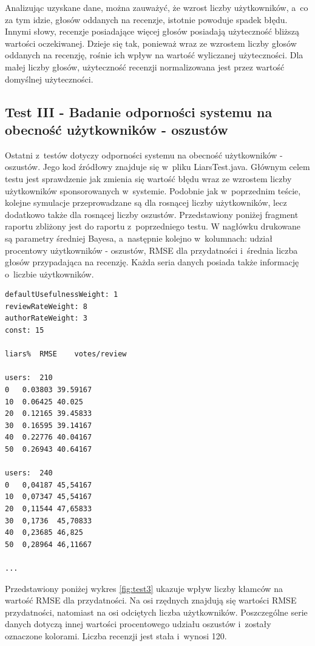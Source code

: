 Analizując uzyskane dane, można zauważyć, że wzrost liczby użytkowników, a~co za tym idzie, głosów oddanych na recenzje, istotnie powoduje spadek błędu. Innymi słowy, recenzje posiadające więcej głosów posiadają użyteczność bliższą wartości oczekiwanej. Dzieje się tak, ponieważ wraz ze wzrostem liczby głosów oddanych na recenzję, rośnie ich wpływ na wartość wyliczanej użyteczności. Dla małej liczby głosów, użyteczność recenzji normalizowana jest przez wartość domyślnej użyteczności.

\subsection{Test III - Badanie odporności systemu na obecność użytkowników - oszustów}

Ostatni z~testów dotyczy odporności systemu na obecność użytkowników - oszustów. Jego kod źródłowy znajduje się w~pliku LiarsTest.java. Głównym celem testu jest sprawdzenie jak zmienia się wartość błędu wraz ze wzrostem liczby użytkowników sponsorowanych w~systemie. Podobnie jak w~poprzednim teście, kolejne symulacje przeprowadzane są dla rosnącej liczby użytkowników, lecz dodatkowo także dla rosnącej liczby oszustów. Przedstawiony poniżej fragment raportu zbliżony jest do raportu z~poprzedniego testu. W nagłówku drukowane są parametry średniej Bayesa, a~następnie kolejno w~kolumnach: udział procentowy użytkowników - oszustów, RMSE dla przydatności i~średnia liczba głosów przypadająca na recenzję. Każda seria danych posiada także informację o~liczbie użytkowników.

\begin{lstlisting}
defaultUsefulnessWeight: 1
reviewRateWeight: 8
authorRateWeight: 3
const: 15

liars%	RMSE	votes/review

users:	210
0	0.03803	39.59167
10	0.06425	40.025
20	0.12165	39.45833
30	0.16595	39.14167
40	0.22776	40.04167
50	0.26943	40.64167

users:	240	
0	0,04187	45,54167
10	0,07347	45,54167
20	0,11544	47,65833
30	0,1736	45,70833
40	0,23685	46,825
50	0,28964	46,11667

...
\end{lstlisting}

Przedstawiony poniżej wykres \ref{fig:test3} ukazuje wpływ liczby kłamców na wartość RMSE dla przydatności. Na osi rzędnych znajdują się wartości RMSE przydatności, natomiast na osi odciętych liczba użytkowników. Poszczególne serie danych dotyczą innej wartości procentowego udziału oszustów i~zostały oznaczone kolorami. Liczba recenzji jest stała i~wynosi 120.

